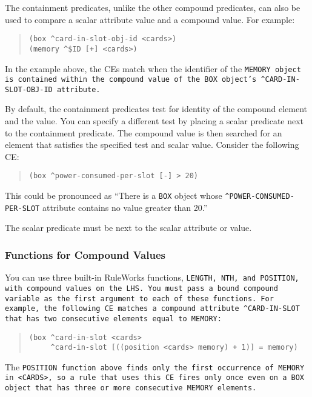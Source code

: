 The containment predicates, unlike the other compound predicates, can
also be used to compare a scalar attribute value and a compound
value. For example:
\begin{quote}
\begin{verbatim}
(box ^card-in-slot-obj-id <cards>)
(memory ^$ID [+] <cards>)
\end{verbatim}
\end{quote}
In the example above, the CEs match when the identifier of the
\tt{MEMORY} object is contained within the compound value of the
\tt{BOX} object's \verb|^CARD-IN-SLOT-OBJ-ID| attribute.

By default, the containment predicates test for identity of the
compound element and the value. You can specify a different test by
placing a scalar predicate next to the containment predicate. The
compound value is then searched for an element that satisfies the
specified test and scalar value. Consider the following CE:
\begin{quote}
\begin{verbatim}
(box ^power-consumed-per-slot [-] > 20)
\end{verbatim}
\end{quote}

This could be pronounced as ``There is a \verb|BOX| object whose
\verb|^POWER-CONSUMED-PER-SLOT| attribute contains no value greater
than 20.''

The scalar predicate must be next to the scalar attribute or value.

\subsubsection*{Functions for Compound Values}

You can use three built-in RuleWorks functions, \tt{LENGTH}, \tt{NTH},
and \tt{POSITION}, with compound values on the LHS. You must pass a
bound compound variable as the first argument to each of these
functions. For example, the following CE matches a compound attribute
\verb|^CARD-IN-SLOT| that has two consecutive elements equal to
\tt{MEMORY}:
\begin{quote}
\begin{verbatim}
(box ^card-in-slot <cards>
     ^card-in-slot [((position <cards> memory) + 1)] = memory)
\end{verbatim}
\end{quote}   
The \tt{POSITION} function above finds only the first occurrence of
\tt{MEMORY} in \verb|<CARDS>|, so a rule that uses this CE fires only
once even on a \tt{BOX} object that has three or more consecutive
\tt{MEMORY} elements.

